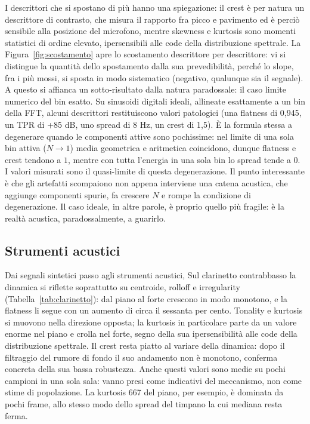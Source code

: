 \documentclass{article}
\begin{document}
I descrittori che si spostano di più hanno una spiegazione: il crest è per natura un descrittore di contrasto, che misura il rapporto fra picco e pavimento ed è perciò sensibile alla posizione del microfono, mentre skewness e kurtosis sono momenti statistici di ordine elevato, ipersensibili alle code della distribuzione spettrale. La Figura~\ref{fig:scostamento} apre lo scostamento descrittore per descrittore: vi si distingue la quantità dello spostamento dalla sua prevedibilità, perché lo slope, fra i più mossi, si sposta in modo sistematico (negativo, qualunque sia il segnale).
A questo si affianca un sotto-risultato dalla natura paradossale: il caso limite numerico del bin esatto. Su sinusoidi digitali ideali, allineate esattamente a un bin della FFT, alcuni descrittori restituiscono valori patologici (una flatness di 0,945, un TPR di +85 dB, uno spread di 8 Hz, un crest di 1,5). È la formula stessa a degenerare quando le componenti attive sono pochissime: nel limite di una sola bin attiva ($N\to1$) media geometrica e aritmetica coincidono, dunque flatness e crest tendono a $1$, mentre con tutta l'energia in una sola bin lo spread tende a $0$. I valori misurati sono il quasi-limite di questa degenerazione. Il punto interessante è che gli artefatti scompaiono non appena interviene una catena acustica, che aggiunge componenti spurie, fa crescere $N$ e rompe la condizione di degenerazione. Il caso ideale, in altre parole, è proprio quello più fragile: è la realtà acustica, paradossalmente, a guarirlo.

\subsection{Strumenti acustici}\label{sec:strumenti}
Dai segnali sintetici passo agli strumenti acustici, %
 Sul clarinetto contrabbasso la dinamica si riflette soprattutto su centroide, rolloff e irregularity (Tabella~\ref{tab:clarinetto}): dal piano al forte crescono in modo monotono, e la flatness li segue con un aumento di circa il sessanta per cento. Tonality e kurtosis si muovono nella direzione opposta; la kurtosis in particolare parte da un valore enorme nel piano e crolla nel forte, segno della sua ipersensibilità alle code della distribuzione spettrale. Il crest resta piatto al variare della dinamica: dopo il filtraggio del rumore di fondo il suo andamento non è monotono, conferma concreta della sua bassa robustezza. Anche questi valori sono medie su pochi campioni in una sola sala: vanno presi come indicativi del meccanismo, non come stime di popolazione. La kurtosis 667 del piano, per esempio, è dominata da pochi frame, allo stesso modo dello spread del timpano la cui mediana resta ferma.
\end{document}
